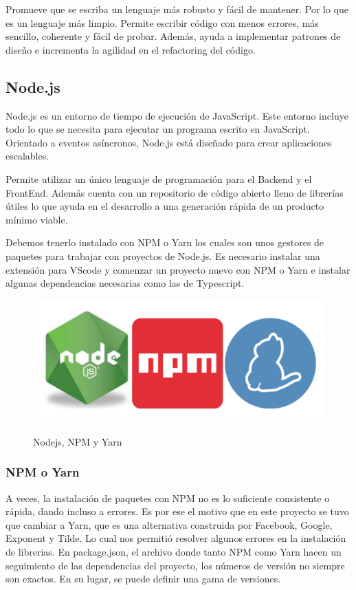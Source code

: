 \documentclass[12pt,twoside,titlepage]{report}
\begin{document}
Promueve que se escriba un lenguaje más robusto y fácil de mantener. Por lo que es un lenguaje más limpio. Permite escribir código con menos errores, más sencillo, coherente y fácil de probar. Además, ayuda a implementar patrones de diseño e incrementa la agilidad en el refactoring del código.

\subsection{Node.js}

Node.js es un entorno de tiempo de ejecución de JavaScript. Este entorno incluye todo lo que se necesita para ejecutar un programa escrito en JavaScript. Orientado a eventos asíncronos, Node.js está diseñado para crear aplicaciones escalables.

Permite utilizar un único lenguaje de programación para el Backend y el FrontEnd. Además cuenta con un repositorio de código abierto lleno de librerías útiles lo que ayuda en el desarrollo a una generación rápida de un producto mínimo viable.

Debemos tenerlo instalado con NPM o Yarn los cuales son unos gestores de paquetes para trabajar con proyectos de Node.js. Es necesario instalar una extensión para VScode y comenzar un proyecto nuevo con NPM o Yarn e instalar algunas dependencias necesarias como las de Typescript.

\begin{figure}[H]
    \centering
    \includegraphics[scale=0.1]{Nodejs/NodeNPMYarn}
    \label{fig:NodeNPMYarn}
    \caption{Nodejs, NPM y Yarn}
\end{figure}

\subsubsection{NPM o Yarn}

A veces, la instalación de paquetes con NPM no es lo suficiente consistente o rápida, dando incluso a errores. Es por ese el motivo que en este proyecto se tuvo que cambiar a Yarn, que es una alternativa construida por Facebook, Google, Exponent y Tilde. Lo cual nos permitió resolver algunos errores en la instalación de librerias.
En package.json, el archivo donde tanto NPM como Yarn hacen un seguimiento de las dependencias del proyecto, los números de versión no siempre son exactos. En su lugar, se puede definir una gama de versiones.
\end{document}
